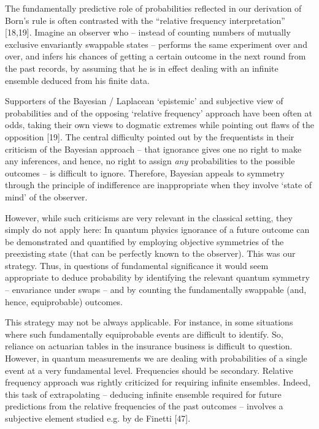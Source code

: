 \documentclass[aps,pra,epsfig,11pt,floatfix]{revtex4}
\begin{document}
The fundamentally predictive role of probabilities reflected in our
derivation of Born's rule is often contrasted with the ``relative frequency
interpretation'' [18,19]. Imagine an observer who -- instead of counting
numbers of mutually exclusive envariantly swappable states -- performs
the same experiment over and over, and infers his chances of getting a certain
outcome in the next round from the past records, by assuming that he is in
effect dealing with an infinite ensemble deduced from his finite data.

Supporters of the Bayesian / Laplacean `epistemic'  and subjective view 
of probabilities and of the opposing `relative frequency' approach have
been often at odds, taking their own views to dogmatic extremes while
pointing out flaws of the opposition [19]. The central difficulty pointed out
by the frequentists in their criticism of the Bayesian approach -- that
ignorance gives one no right to make any inferences, and hence, no
right to assign {\it any} probabilities to the possible outcomes -- is difficult
to ignore. Therefore, Bayesian appeals to symmetry through the principle 
of indifference are inappropriate when they involve `state of mind' of the observer. 

However, while such criticisms are very relevant in the classical setting, they
simply do not apply here: In quantum physics ignorance of a future outcome 
can be demonstrated and quantified by employing objective symmetries of
the preexisting state (that can be perfectly known to the observer). This was 
our strategy. Thus, in questions of fundamental significance it would seem 
appropriate to deduce probability by identifying the relevant quantum symmetry --
envariance under swaps -- and by counting the fundamentally swappable (and,
hence, equiprobable) outcomes. 

This strategy may not be always applicable. For instance, in some
situations where such fundamentally equiprobable events are difficult
to identify. So, reliance on actuarian tables in the insurance business is 
difficult to question. However, in quantum measurements we are dealing 
with probabilities of a single event at a very fundamental level. Frequencies 
should be secondary. Relative frequency approach was rightly criticized for 
requiring infinite ensembles. Indeed, this task of extrapolating -- deducing infinite 
ensemble required for future predictions from the relative frequencies of the past
outcomes -- involves a subjective element studied e.g. by de Finetti [47].
\end{document}
